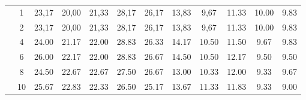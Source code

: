 \begin{table}[H]
\begin{tabular}{|c|c|c c c c c|c c c c c|}
\multicolumn{1}{|c|}{ \multirow{6}{*}{\rotatebox[origin=c]{90}{\textbf{K-vizinhos}}} }
&1	&23,17	&20,00	&21,33	&28,17	&26,17	&13,83	&9,67	&11.33	&10.00	&9.83\\\cline{2-12}
&2	&23,17	&20,00	&21,33	&28,17	&26,17	&13,83	&9,67	&11.33	&10.00	&9.83\\\cline{2-12}
&4	&24.00	&21.17	&22.00	&28.83	&26.33	&14.17	&10.50	&11.50	&9.67	&9.83\\\cline{2-12}
&6	&26.00	&22.17	&22.00	&28.83	&26.67	&14.50	&10.50	&12.17	&9.50	&9.50\\\cline{2-12}
&8	&24.50	&22.67	&22.67	&27.50	&26.67	&13.00	&10.33	&12.00	&9.33	&9.67\\\cline{2-12}
&10	&25.67	&22.83	&22.33	&26.50	&25.17	&13.67	&11.33	&11.83	&9.33	&9.00\\\midrule






	\end{tabular}
\end{table}



